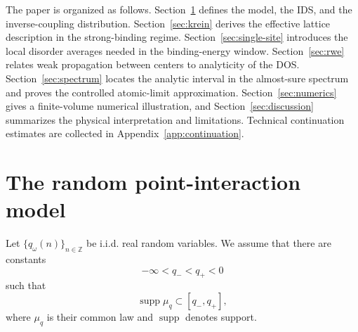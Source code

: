 \documentclass[12pt,a4paper]{article}
\numberwithin{equation}{section}
\newcommand{\supp}{\operatorname{supp}}
\newcommand{\Z}{\mathbb Z}
\begin{document}
The paper is organized as follows.  Section~\ref{sec:model} defines the model,
the IDS, and the inverse-coupling distribution.  Section~\ref{sec:krein}
derives the effective lattice description in the strong-binding regime.
Section~\ref{sec:single-site} introduces the local disorder averages needed in
the binding-energy window.  Section~\ref{sec:rwe} relates weak propagation
between centers to analyticity of the DOS.  Section~\ref{sec:spectrum} locates the
analytic interval in the almost-sure spectrum and proves the controlled
atomic-limit approximation.  Section~\ref{sec:numerics} gives a finite-volume
numerical illustration, and Section~\ref{sec:discussion} summarizes the
physical interpretation and limitations.  Technical continuation estimates are collected in Appendix~\ref{app:continuation}.

\section{The random point-interaction model}\label{sec:model}

Let $\{q_\omega(n)\}_{n\in\Z}$ be i.i.d. real random variables.  We assume
that there are constants
$$
-\infty<q_-<q_+<0
$$
such that
$$
\supp\mu_q\subset[q_-,q_+],
$$
where $\mu_q$ is their common law and $\supp$ denotes support.
\end{document}
